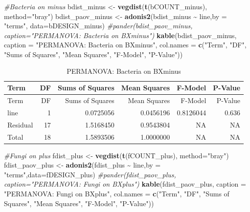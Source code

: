 \documentclass[
  11pt,
]{article}
\newenvironment{Shaded}{\begin{snugshade}}{\end{snugshade}}
\newcommand{\AttributeTok}[1]{\textcolor[rgb]{0.13,0.29,0.53}{#1}}
\newcommand{\CommentTok}[1]{\textcolor[rgb]{0.56,0.35,0.01}{\textit{#1}}}
\newcommand{\FunctionTok}[1]{\textcolor[rgb]{0.13,0.29,0.53}{\textbf{#1}}}
\newcommand{\NormalTok}[1]{#1}
\newcommand{\OtherTok}[1]{\textcolor[rgb]{0.56,0.35,0.01}{#1}}
\newcommand{\SpecialCharTok}[1]{\textcolor[rgb]{0.81,0.36,0.00}{\textbf{#1}}}
\newcommand{\StringTok}[1]{\textcolor[rgb]{0.31,0.60,0.02}{#1}}
\begin{document}
\begin{Shaded}
\begin{Highlighting}[]
\CommentTok{\#Bacteria on minus}
\NormalTok{bdist\_minus }\OtherTok{\textless{}{-}} \FunctionTok{vegdist}\NormalTok{(}\FunctionTok{t}\NormalTok{(bCOUNT\_minus), }\AttributeTok{method=}\StringTok{"bray"}\NormalTok{)}
\NormalTok{bdist\_paov\_minus }\OtherTok{\textless{}{-}} \FunctionTok{adonis2}\NormalTok{(bdist\_minus }\SpecialCharTok{\textasciitilde{}}\NormalTok{ line,}\AttributeTok{by =} \StringTok{"terms"}\NormalTok{, }\AttributeTok{data=}\NormalTok{bDESIGN\_minus)}
\CommentTok{\#pander(bdist\_paov\_minus, caption="PERMANOVA: Bacteria on BXminus")}
\FunctionTok{kable}\NormalTok{(bdist\_paov\_minus, }\AttributeTok{caption =} \StringTok{"PERMANOVA: Bacteria on BXminus"}\NormalTok{,}
      \AttributeTok{col.names =} \FunctionTok{c}\NormalTok{(}\StringTok{"Term"}\NormalTok{, }\StringTok{"DF"}\NormalTok{, }\StringTok{"Sums of Squares"}\NormalTok{, }\StringTok{"Mean Squares"}\NormalTok{, }\StringTok{"F{-}Model"}\NormalTok{, }\StringTok{"P{-}Value"}\NormalTok{))}
\end{Highlighting}
\end{Shaded}

\begin{longtable}[]{@{}lrrrrr@{}}
\caption{PERMANOVA: Bacteria on BXminus}\tabularnewline
\toprule\noalign{}
Term & DF & Sums of Squares & Mean Squares & F-Model & P-Value \\
\midrule\noalign{}
\endfirsthead
\toprule\noalign{}
Term & DF & Sums of Squares & Mean Squares & F-Model & P-Value \\
\midrule\noalign{}
\endhead
\bottomrule\noalign{}
\endlastfoot
line & 1 & 0.0725056 & 0.0456196 & 0.8126044 & 0.636 \\
Residual & 17 & 1.5168450 & 0.9543804 & NA & NA \\
Total & 18 & 1.5893506 & 1.0000000 & NA & NA \\
\end{longtable}

\begin{Shaded}
\begin{Highlighting}[]
\CommentTok{\#Fungi on plus}
\NormalTok{fdist\_plus }\OtherTok{\textless{}{-}} \FunctionTok{vegdist}\NormalTok{(}\FunctionTok{t}\NormalTok{(fCOUNT\_plus), }\AttributeTok{method=}\StringTok{"bray"}\NormalTok{)}
\NormalTok{fdist\_paov\_plus }\OtherTok{\textless{}{-}} \FunctionTok{adonis2}\NormalTok{(fdist\_plus }\SpecialCharTok{\textasciitilde{}}\NormalTok{ line,}\AttributeTok{by =} \StringTok{"terms"}\NormalTok{,}\AttributeTok{data=}\NormalTok{fDESIGN\_plus)}
\CommentTok{\#pander(fdist\_paov\_plus, caption="PERMANOVA: Fungi on BXplus")}
\FunctionTok{kable}\NormalTok{(fdist\_paov\_plus, }\AttributeTok{caption =} \StringTok{"PERMANOVA: Fungi on BXplus"}\NormalTok{,}
      \AttributeTok{col.names =} \FunctionTok{c}\NormalTok{(}\StringTok{"Term"}\NormalTok{, }\StringTok{"DF"}\NormalTok{, }\StringTok{"Sums of Squares"}\NormalTok{, }\StringTok{"Mean Squares"}\NormalTok{, }\StringTok{"F{-}Model"}\NormalTok{, }\StringTok{"P{-}Value"}\NormalTok{))}
\end{Highlighting}
\end{Shaded}
\end{document}
